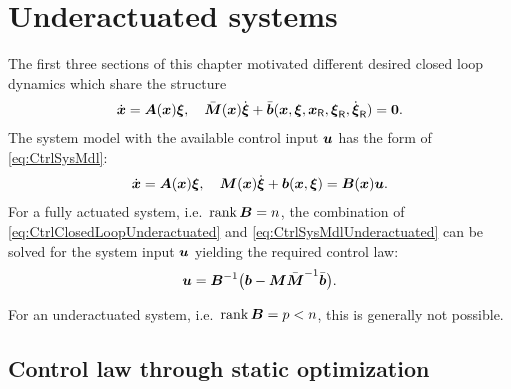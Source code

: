 \section{Underactuated systems}\label{sec:CtrlUnderactuated}
The first three sections of this chapter motivated different desired closed loop dynamics which share the structure
\begin{align}\label{eq:CtrlClosedLoopUnderactuated}
 \dot{\boldsymbol{x}} = \boldsymbol{A}(\boldsymbol{x}) \boldsymbol{\xi}, 
\quad
 \bar{\boldsymbol{M}}(\boldsymbol{x}) \dot{\boldsymbol{\xi}} + \bar{\boldsymbol{b}}(\boldsymbol{x}, \boldsymbol{\xi}, \boldsymbol{x}_{\mathsf{R}}, \boldsymbol{\xi}_{\mathsf{R}}, \dot{\boldsymbol{\xi}}_{\mathsf{R}}) = \boldsymbol{0}.
\end{align}
The system model with the available control input $\boldsymbol{u}$ has the form of \eqref{eq:CtrlSysMdl}:
\begin{align}\label{eq:CtrlSysMdlUnderactuated}
 \dot{\boldsymbol{x}} = \boldsymbol{A}(\boldsymbol{x}) \boldsymbol{\xi}, 
\quad
 \boldsymbol{M}(\boldsymbol{x}) \dot{\boldsymbol{\xi}} + \boldsymbol{b}(\boldsymbol{x}, \boldsymbol{\xi}) = \boldsymbol{B}(\boldsymbol{x}) \boldsymbol{u}.
\end{align}
For a fully actuated system, i.e.\ $\operatorname{rank}\boldsymbol{B} = n$, the combination of \eqref{eq:CtrlClosedLoopUnderactuated} and \eqref{eq:CtrlSysMdlUnderactuated} can be solved for the system input $\boldsymbol{u}$ yielding the required control law:
\begin{align}
 \boldsymbol{u} = \boldsymbol{B}^{-1}\big( \boldsymbol{b} - \boldsymbol{M} \bar{\boldsymbol{M}}^{-1} \bar{\boldsymbol{b}} \big)
 .
\end{align}

For an underactuated system, i.e.\ $\operatorname{rank}\boldsymbol{B} = p < n$, this is generally not possible.


\subsection{Control law through static optimization}\label{sec:CtrlUnderactuatedOptim}

